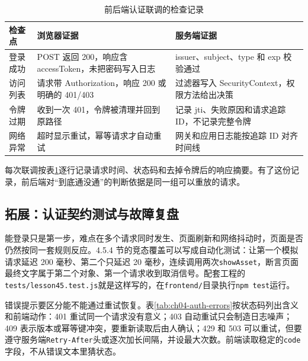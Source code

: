 \begin{table}[htbp]
\centering
\caption{前后端认证联调的检查记录}
\label{tab:ch04-auth-contract}
\begin{tabular}{p{}p{}p{}}
\toprule
检查点 & 浏览器证据 & 服务端证据 \\
\midrule
登录成功 & POST 返回 200，响应含 accessToken，未把密码写入日志 & issuer、subject、type 和 exp 校验通过 \\
访问列表 & 请求带 Authorization，响应 200 或明确的 401/403 & 过滤器写入 SecurityContext，权限方法给出决策 \\
令牌过期 & 收到一次 401，令牌被清理并回到原路径 & 记录 jti、失败原因和请求追踪 ID，不记录完整令牌 \\
网络异常 & 超时显示重试，幂等请求才自动重试 & 网关和应用日志能按追踪 ID 对齐时间线 \\
\bottomrule
\end{tabular}
\end{table}

每次联调按表\ref{tab:ch04-auth-contract}逐行记录请求时间、状态码和去掉令牌后的响应摘要。有了这份记录，前后端对“到底通没通”的判断依据是同一组可以重放的请求。

\subsection{拓展：认证契约测试与故障复盘}

能登录只是第一步，难点在多个请求同时发生、页面刷新和网络抖动时，页面是否仍然按同一套规则反应。4.5.4 节的竞态覆盖可以写成自动化测试：让第一个模拟请求延迟 200 毫秒、第二个只延迟 20 毫秒，连续调用两次\texttt{showAsset}，断言页面最终文字属于第二个对象、第一个请求收到取消信号。配套工程的\texttt{tests/lesson45.test.js}就是这样写的，在\texttt{frontend/}目录执行\texttt{npm test}运行。

错误提示要区分能不能通过重试恢复。表\ref{tab:ch04-auth-errors}按状态码列出含义和前端动作：401 重试同一个请求没有意义；403 自动重试只会制造日志噪声；409 表示版本或幂等键冲突，要重新读取后由人确认；429 和 503 可以重试，但要遵守服务端\texttt{Retry-After}头或逐次加长间隔，并设最大次数。前端读取稳定的\texttt{code}字段，不从错误文本里猜状态。

